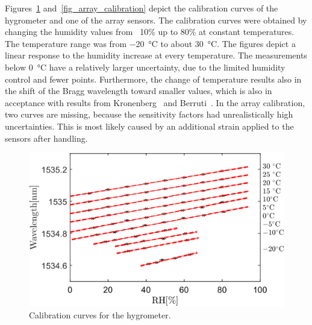 \newpage
Figures~\ref{fig_single_calibration} and~\ref{fig_array_calibration} depict the calibration curves of the hygrometer and one of the array sensors. The calibration curves were obtained by changing the humidity values from ~10\% up to 80\% at constant temperatures. The temperature range was from \SI{-20}{\celsius} to about \SI{30}{\celsius}. The figures depict a linear response to the humidity increase at every temperature. The measurements below \SI{0}{\celsius} have a relatively larger uncertainty, due to the limited humidity control and fewer points. Furthermore, the change of temperature results also in the shift of the Bragg wavelength toward smaller values, which is also in acceptance with results from Kronenberg~\cite{Kronenberg:02} and Berruti~\cite{Berruti}. In the array calibration, two curves are missing, because the sensitivity factors had unrealistically high uncertainties. This is most likely caused by an additional strain applied to the sensors after handling. %

\begin{figure}[!h]
\centering
\includegraphics[width=0.8\columnwidth]{Chapter5/images/RHS.png}
\caption{Calibration curves for the hygrometer.}
\label{fig_single_calibration}
\end{figure}

